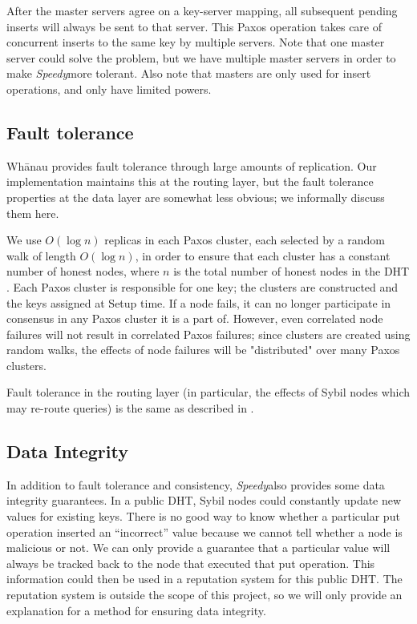 \documentclass[letter]{article}
\newcommand{\sys}{\textit{Speedy}\space}
\begin{document}
After the master servers agree on a key-server mapping, all subsequent pending
inserts will always be sent to that server. This Paxos operation takes care of
concurrent inserts to the same key by multiple servers. Note that one master server
could solve the problem, but we have multiple master servers in order to make
\sys more tolerant. Also note that masters are only used for insert operations, and
only have limited powers.

\subsection{Fault tolerance}

Wh\={a}nau provides fault tolerance through large amounts of replication. Our
implementation maintains this at the routing layer, but the fault tolerance
properties at the data layer are somewhat less obvious; we informally
discuss them here.

We use $O(\log n)$ replicas in each Paxos cluster, each selected by a random walk
of length $O(\log n)$, in order to ensure that each cluster has a constant
number of honest nodes, where $n$ is the total number of honest nodes in the
DHT \cite{whanauthesis}. Each Paxos cluster is responsible for one key;
the clusters are constructed and the keys assigned at Setup time.
If a node fails, it can no longer participate in consensus in any Paxos
cluster it is a part of. However, even correlated node failures will
not result in correlated Paxos failures; since clusters are created using
random walks, the effects of node failures will be "distributed" over
many Paxos clusters.

Fault tolerance in the routing layer (in particular, the effects of
Sybil nodes which may re-route queries) is the same as described in
\cite{whanau}.

\subsection{Data Integrity}
In addition to fault tolerance and consistency, \sys also provides some data integrity guarantees. In a public DHT, Sybil nodes could constantly update
new values for existing keys. There is no good way to know whether a particular
put operation inserted an ``incorrect'' value because we cannot tell whether
a node is malicious or not. We can only provide a guarantee that a particular
value will always be tracked back to the node that executed that put operation.
This information could then be used in a reputation system for this public DHT.
The reputation system is outside the scope of this project, so we will only
provide an explanation for a method for ensuring data integrity.
\end{document}
